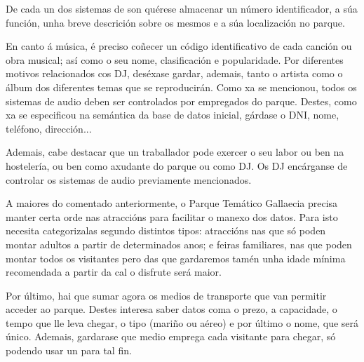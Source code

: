 \documentclass[12pt,a4paper]{book}
\theoremstyle{definition}
\theoremstyle{break}
\begin{document}
	De cada un dos sistemas de son quérese almacenar un número identificador, a súa función, unha breve descrición sobre os mesmos e a súa localización no
	parque.
	
	En canto á música, é preciso coñecer un código identificativo de cada canción
	ou obra musical; así como o seu nome, clasificación e popularidade. Por diferentes motivos relacionados cos DJ, deséxase gardar, ademais, tanto o artista como o
	álbum dos diferentes temas que se reproducirán.
	Como xa se mencionou, todos os sistemas de audio deben ser controlados por empregados
	do parque. Destes, como xa se especificou na semántica da base de datos
	inicial, gárdase o DNI, nome, teléfono, dirección...
	
	Ademais, cabe destacar que un traballador pode exercer o seu labor ou ben na
	hostelería, ou ben como axudante do parque ou como DJ. Os DJ encárganse de controlar
	os sistemas de audio previamente mencionados.
	
	A maiores do comentado anteriormente, o Parque Temático {\logo Gallaecia} precisa
	manter certa orde nas atraccións para facilitar o manexo dos datos. Para isto necesita categorizalas segundo distintos tipos: atraccións nas que só poden montar adultos a partir de determinados anos; e feiras familiares, nas que poden montar todos os visitantes pero das
	que gardaremos tamén unha idade mínima recomendada a partir da cal o disfrute
	será maior.
	
	Por último, hai que sumar agora os medios de transporte que
	van permitir acceder ao parque. Destes interesa saber datos coma o prezo, a
	capacidade, o tempo que lle leva chegar, o tipo (mariño ou aéreo) e por último o
	nome, que será único.
	Ademais, gardarase que medio emprega cada visitante para chegar, só podendo
	usar un para tal fin.
	
\end{document}
